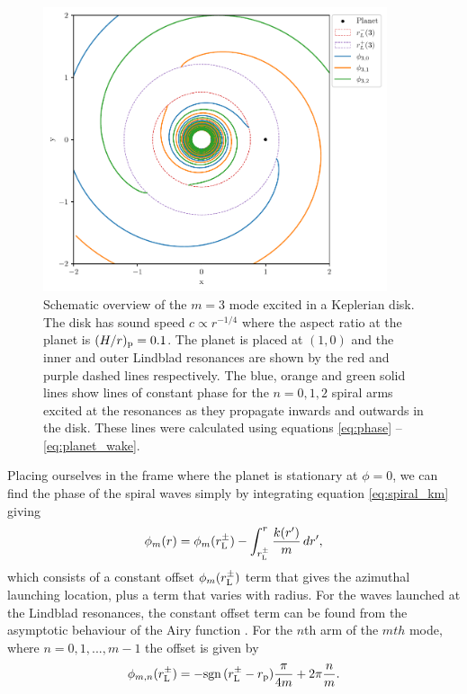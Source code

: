 \begin{figure}
    \centering
    \includegraphics[width = 0.9\textwidth]{figures/wakes_m3.pdf}
    \caption{Schematic overview of the $m=3$ mode excited in a Keplerian disk. The disk has sound speed $c \propto r^{-1/4}$ where the aspect ratio at the planet is $(H/r)_{\rm p} = 0.1$.
    The planet is placed at $(1,0)$ and the inner and outer Lindblad resonances are shown by the red and purple dashed lines respectively.
    The blue, orange and green solid lines show lines of constant phase for the $n=0,1,2$ spiral arms excited at the resonances as they propagate inwards and outwards in the disk.
    These lines were calculated using equations \ref{eq:phase} -- \ref{eq:planet_wake}.}
    \label{fig:wakes_m3}
\end{figure}
Placing ourselves in the frame where the planet is stationary at $\phi = 0$, we can find the phase of the spiral waves simply by integrating equation \ref{eq:spiral_km} giving \citep{bae2018a}
\begin{align}
    \phi_m (r) = \phi_m(r_{\rm L}^\pm) - \int_{r_{\rm L}^\pm}^r \frac{k(r')}{m} \, dr', \label{eq:phase}
\end{align}
which consists of a constant offset $\phi_m(r_{\rm L}^\pm)$ term that gives the azimuthal launching location, plus a term that varies with radius.
For the waves launched at the Lindblad resonances, the constant offset term can be found from the asymptotic behaviour of the Airy function \citep{ward1986}. 
For the $n$th arm of the $mth$ mode, where $n = 0, 1, ..., m-1$ the offset is given by 
\begin{align}
    \phi_{m,n}(r_{\rm L}^\pm) = - \mathrm{sgn}\, (r_{\rm L}^\pm - r_{\rm p}) \frac{\pi}{4m} + 2 \pi\frac{n}{m}. \label{eq:spiral_offset}
\end{align}
